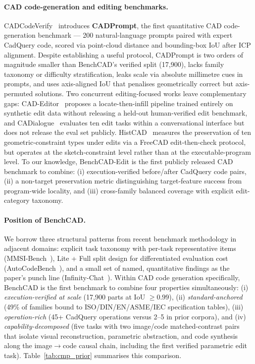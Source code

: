 \documentclass{article}
\begin{document}
\paragraph{CAD code-generation and editing benchmarks.}
CADCodeVerify~\citep{Alrashedy2025} introduces \textbf{CADPrompt}, the first quantitative CAD code-generation benchmark --- 200 natural-language prompts paired with expert CadQuery code, scored via point-cloud distance and bounding-box IoU after ICP alignment. Despite establishing a useful protocol, CADPrompt is two orders of magnitude smaller than BenchCAD's verified split (17{,}900), lacks family taxonomy or difficulty stratification, leaks scale via absolute millimetre cues in prompts, and uses axis-aligned IoU that penalises geometrically correct but axis-permuted solutions. Two concurrent editing-focused works leave complementary gaps: CAD-Editor~\citep{CADEditor2025} proposes a locate-then-infill pipeline trained entirely on synthetic edit data without releasing a held-out human-verified edit benchmark, and CADialogue~\citep{CADialogue2025} evaluates ten edit tasks within a conversational interface but does not release the eval set publicly. HistCAD~\citep{Dong2026} measures the preservation of ten geometric-constraint types under edits via a FreeCAD edit-then-check protocol, but operates at the sketch-constraint level rather than at the executable-program level. To our knowledge, BenchCAD-Edit is the first publicly released CAD benchmark to combine: (i) execution-verified before/after CadQuery code pairs, (ii) a non-target preservation metric distinguishing target-feature success from program-wide locality, and (iii) cross-family balanced coverage with explicit edit-category taxonomy.

\paragraph{Position of BenchCAD.}
We borrow three structural patterns from recent benchmark methodology in adjacent domains: explicit task taxonomy with per-task representative items (MMSI-Bench~\citep{MMSIBench2026}), Lite + Full split design for differentiated evaluation cost (AutoCodeBench~\citep{Chou2026}), and a small set of named, quantitative findings as the paper's punch line (Infinity-Chat~\citep{Hivemind2025}). Within CAD code generation specifically, BenchCAD is the first benchmark to combine four properties simultaneously: (i) \emph{execution-verified at scale} (17{,}900 parts at IoU $\geq 0.99$), (ii) \emph{standard-anchored} (49\% of families bound to ISO/DIN/EN/ASME/IEC specification tables), (iii) \emph{operation-rich} (45+ CadQuery operations versus 2--5 in prior corpora), and (iv) \emph{capability-decomposed} (five tasks with two image/code matched-contrast pairs that isolate visual reconstruction, parametric abstraction, and code synthesis along the image$\to$code causal chain, including the first verified parametric edit task). Table~\ref{tab:cmp_prior} summarises this comparison.
\end{document}
